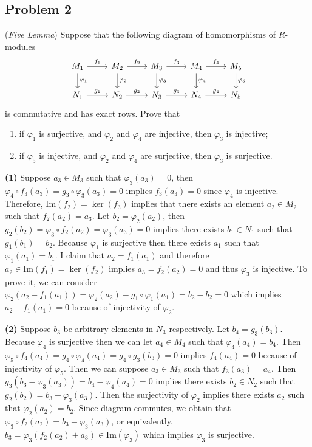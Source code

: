 \subsection*{Problem 2}
(\textit{Five Lemma}) Suppose that the following diagram of homomorphisms of $R$-modules
\[\begin{tikzcd}
    M_1 \arrow[r,"f_1"] \arrow[d, "\varphi_1"] & M_2 \arrow[r,"f_2"] \arrow[d, "\varphi_2"] & M_3 \arrow[r,"f_3"] \arrow[d, "\varphi_3"] & M_4 \arrow[r,"f_4"] \arrow[d, "\varphi_4"] & M_5 \arrow[d, "\varphi_5"] \\
    N_1 \arrow[r,"g_1"] & N_2 \arrow[r,"g_2"] & N_3 \arrow[r,"g_3"] & N_4 \arrow[r,"g_4"] & N_5
\end{tikzcd}\]
is commutative and has exact rows. Prove that
\begin{enumerate}
    \item[(1)] if $\varphi_1$ is surjective, and $\varphi_2$ and $\varphi_4$ are injective, then $\varphi_3$ is injective;
    \item[(2)] if $\varphi_5$ is injective, and $\varphi_2$ and $\varphi_4$ are surjective, then $\varphi_3$ is surjective.
\end{enumerate}

\begin{solution}
    \textbf{(1)} Suppose $a_3\in M_3$ such that $\varphi_3(a_3) = 0$, then $\varphi_4\circ f_3(a_3) = g_3\circ \varphi_3(a_3)=0$ implies $f_3(a_3)=0$
    since $\varphi_4$ is injective. Therefore, $\text{Im}(f_2)=\ker(f_3)$ implies that there exists an element $a_2\in M_2$ such that $f_2(a_2)=a_3$.
    Let $b_2 = \varphi_2(a_2)$, then $g_2(b_2) = \varphi_3\circ f_2(a_2)= \varphi_3(a_3)=0$ implies there exists $b_1\in N_1$ such that $g_1(b_1)=b_2$. 
    Because $\varphi_1$ is surjective then there exists $a_1$ such that $\varphi_1(a_1)=b_1$. I claim that $a_2=f_1(a_1)$ and therefore $a_2\in \text{Im}(f_1)=\ker(f_2)$ implies
    $a_3=f_2(a_2)=0$ and thus $\varphi_3$ is injective. To prove it, we can consider $\varphi_2(a_2-f_1(a_1))=\varphi_2(a_2) - g_1\circ \varphi_{1}(a_1) = b_2-b_2=0$  which 
    implies $a_2-f_1(a_1)=0$ because of injectivity of $\varphi_2$.
    
    \textbf{(2)} Suppose $b_3$ be arbitrary elements in $N_3$ respectively. Let $b_4=g_3(b_3)$. Because $\varphi_4$ is surjective 
    then we can let $a_4 \in M_4$ such that $\varphi_4(a_4)=b_4$. Then $\varphi_5\circ f_4(a_4)=g_4\circ \varphi_4(a_4) = g_4\circ g_3(b_3) = 0$ implies 
    $f_4(a_4)=0$ because of injectivity of $\varphi_5$. Then we can suppose $a_3\in M_3$ such that $f_3(a_3)= a_4$. Then $g_3(b_3-\varphi_3(a_3))= b_4-\varphi_4(a_4)=0$ implies 
    there exists $b_2\in N_2$ such that $g_2(b_2) = b_3-\varphi_3(a_3)$. Then the surjectivity of $\varphi_2$ implies there exists $a_2$ such that $\varphi_2(a_2)=b_2$.
    Since diagram commutes, we obtain that $\varphi_3\circ f_2(a_2) = b_3-\varphi_3(a_3)$, or equivalently, $b_3 = \varphi_3(f_2(a_2)+a_3)\in \text{Im}(\varphi_3)$ which implies $\varphi_3$ is 
    surjective.
\end{solution}

